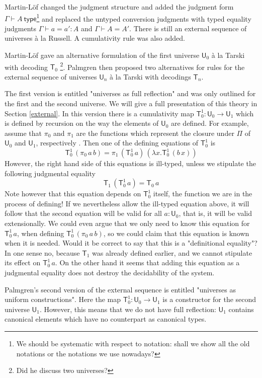\documentclass[11pt,a4paper]{article}
\def\UU{\mathsf{U}}
\newcommand{\type}{\mathsf{type}}
\newcommand{\T}{\mathsf{T}}
\begin{document}
Martin-Löf \cite{martinlof:hannover} changed the judgment structure and added the judgment form $\Gamma \vdash A\ \type$\footnote{We should be systematic with respect to notation: shall we show all the old notations or the notations we use nowadays?} and replaced the untyped conversion judgments with typed equality judgments $\Gamma \vdash a = a' : A$ and $\Gamma \vdash A = A'$. There is still an external sequence of universes \`a la Russell. A cumulativity rule was also added.

Martin-Löf \cite{martinlof:padova} gave an alternative formulation of the first universe $\UU_0$ \`a la Tarski with decoding $\T_0$ \footnote{Did he discuss two universes?}.
Palmgren \cite{palmgren:venice} then proposed two alternatives for rules for the external sequence of universes $\UU_n$ \`a la Tarski with decodings $\T_n$. 

The first version is entitled "universes as full reflection" and was only outlined for the first and the second universe. We will give a full presentation of this theory in Section \ref{external}. In this version there is a cumulativity map $\T_0^1 : \UU_0 \to \UU_1$ which is defined by recursion on the way the elements of $\UU_0$ are defined. For example, assume that $\pi_0$ and $\pi_1$ are the functions which represent the closure under $\Pi$ of $\UU_0$ and $\UU_1$, respectively . Then one of the defining equations of $\T_0^1$ is
$$
\T_0^1\, (\pi_0\,a\, b) = \pi_1\,(\T_0^1\,a)\,(\lambda x.\T_0^1\,(b\,x))
$$
However, the right hand side of this equations is ill-typed, unless we stipulate the following judgmental equality
$$
\T_1\, (\T_0^1\, a) = \T_0\, a
$$
Note however that this equation depends on $\T_0^1$ itself, the function we are in the process of defining! If we nevertheless allow the ill-typed equation above, it will follow that the second equation will be valid for all $a : \UU_0$, that is, it will be valid extensionally. We could even argue that we only need to know this equation for $\T_0^1\, a$, when defining $\T_0^1\, (\pi_0\,a\, b)$, so we could claim that this equation is known when it is needed. Would it be correct to say that this is a "definitional equality"? In one sense no, because $\T_1$ was already defined earlier, and we cannot stipulate its effect on $\T_0^1\, a$. On the other hand it seems that adding this equation as a judgmental equality does not destroy the decidability of the system.

Palmgren's second version of the external sequence is entitled "universes as uniform constructions". Here the map $\T_0^1 : \UU_0 \to \UU_1$ is a constructor for the second universe $\UU_1$. However, this means that we do not have full reflection: $\UU_1$ contains canonical elements which have no counterpart as canonical types.
\end{document}
